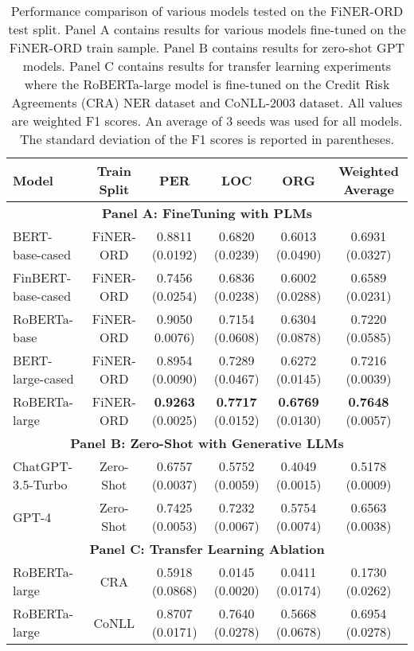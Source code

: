 \documentclass[11pt]{article}
\begin{document}
\begin{table*}[ht]
\centering
\footnotesize
\begin{tabular}{lccccc}
  \hline
  \textbf{Model} & \textbf{Train Split} & \textbf{PER} & \textbf{LOC} & \textbf{ORG} & \textbf{Weighted Average} \\ 
  \hline
     \multicolumn{6}{c}{\textbf{Panel A: FineTuning with PLMs}} \\ 
    \hline
  BERT-base-cased & FiNER-ORD & 0.8811 (0.0192) & 0.6820 (0.0239) & 0.6013 (0.0490) & 0.6931 (0.0327) \\ 
  FinBERT-base-cased & FiNER-ORD & 0.7456 (0.0254) & 0.6836 (0.0238) & 0.6002 (0.0288) & 0.6589 (0.0231)\\  
  RoBERTa-base & FiNER-ORD & 0.9050 0.0076) & 0.7154 (0.0608) & 0.6304 (0.0878) & 0.7220 (0.0585)\\ 
  \hline
  BERT-large-cased & FiNER-ORD & 0.8954 (0.0090) & 0.7289 (0.0467) & 0.6272 (0.0145) & 0.7216 (0.0039)\\ 
  RoBERTa-large & FiNER-ORD  & \textbf{0.9263} (0.0025) & \textbf{0.7717} (0.0152) & \textbf{0.6769} (0.0130) & \textbf{0.7648} (0.0057)\\
   \hline
   \multicolumn{6}{c}{\textbf{Panel B: Zero-Shot with Generative LLMs}} \\ 
    \hline
   ChatGPT-3.5-Turbo & Zero-Shot & 0.6757 (0.0037) & 0.5752 (0.0059) & 0.4049 (0.0015) & 0.5178 (0.0009)\\
   GPT-4 & Zero-Shot & 0.7425 (0.0053) & 0.7232 (0.0067) & 0.5754 (0.0074) & 0.6563 (0.0038)\\
    \hline
    \multicolumn{6}{c}{\textbf{Panel C: Transfer Learning Ablation}} \\ 
    \hline
      RoBERTa-large & CRA  & 0.5918 (0.0868) & 0.0145 (0.0020) & 0.0411 (0.0174) & 0.1730 (0.0262)\\
      RoBERTa-large & CoNLL  & 0.8707 (0.0171) & 0.7640 (0.0278) & 0.5668 (0.0678) & 0.6954 (0.0278)\\
    \hline
\end{tabular}

\caption{Performance comparison of various models tested on the FiNER-ORD test split. Panel A contains results for various models fine-tuned on the FiNER-ORD train sample. Panel B contains results for zero-shot GPT models. Panel C contains results for transfer learning experiments where the RoBERTa-large model is fine-tuned on the Credit Risk Agreements (CRA) NER dataset and CoNLL-2003 dataset. All values are weighted F1 scores. An average of 3 seeds was used for all models. The standard deviation of the F1 scores is reported in parentheses.}
\label{tb:master_performance}
\end{table*}
\end{document}
